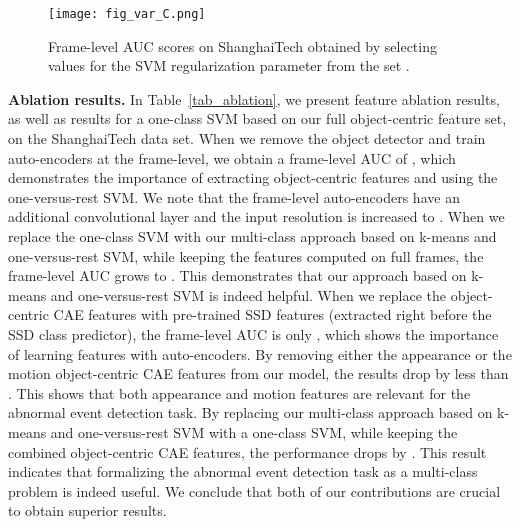 \documentclass[10pt,twocolumn,letterpaper]{article}
\begin{document}
\begin{figure}[!t]
\begin{center}
\texttt{[image: fig\_var\_C.png]}
\end{center}
\vspace*{-0.4cm}
\caption{Frame-level AUC scores on ShanghaiTech obtained by selecting values for the SVM regularization parameter  from the set .}
\label{fig_var_C}
\vspace*{-0.4cm}
\end{figure}

\noindent
{\bf Ablation results.}
In Table~\ref{tab_ablation}, we present feature ablation results, as well as results for a one-class SVM based on our full object-centric feature set, on the ShanghaiTech data set. When we remove the object detector and train auto-encoders at the frame-level, we obtain a frame-level AUC of , which demonstrates the importance of extracting object-centric features and using the one-versus-rest SVM. We note that the frame-level auto-encoders have an additional convolutional layer and the input resolution is increased to . When we replace the one-class SVM with our multi-class approach based on k-means and one-versus-rest SVM, while keeping the features computed on full frames, the frame-level AUC grows to . This demonstrates that our approach based on k-means and one-versus-rest SVM is indeed helpful. When we replace the object-centric CAE features with pre-trained SSD features (extracted right before the SSD class predictor), the frame-level AUC is only , which shows the importance of learning features with auto-encoders. By removing either the appearance or the motion object-centric CAE features from our model, the results drop by less than . This shows that both appearance and motion features are relevant for the abnormal event detection task. By replacing our multi-class approach based on k-means and one-versus-rest SVM with a one-class SVM, while keeping the combined object-centric CAE features, the performance drops by . This result indicates that formalizing the abnormal event detection task as a multi-class problem is indeed useful. We conclude that both of our contributions are crucial to obtain superior results.
\end{document}
